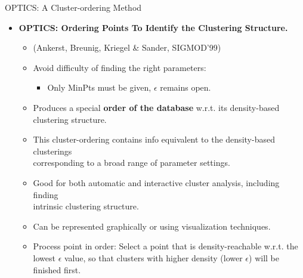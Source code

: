 \begin{frame}{OPTICS: A Cluster-ordering Method}
	\begin{itemize}
		\item \textbf{OPTICS: Ordering Points To Identify the Clustering
			      Structure.}
		      \begin{itemize}
			      \item (Ankerst, Breunig, Kriegel \& Sander, SIGMOD'99)
			      \item Avoid difficulty of finding the right parameters:
			            \begin{itemize}
				            \item Only MinPts must be given, $\epsilon$ remains open.
			            \end{itemize}
			      \item Produces a special \textbf{order of the database} w.r.t. its
			            density-based clustering structure.
			      \item This cluster-ordering contains info equivalent to the
			            density-based clusterings \\ corresponding to a broad range of
			            parameter settings.
			      \item Good for both automatic and interactive cluster analysis,
			            including finding \\
			            intrinsic clustering structure.
			      \item Can be represented graphically or using visualization
			            techniques.
			      \item Process point in order: Select a point that is
			            density-reachable w.r.t. the lowest $\epsilon$ value, so that
			            clusters with higher density (lower $\epsilon$) will be finished
			            first.
		      \end{itemize}
	\end{itemize}
\end{frame}

